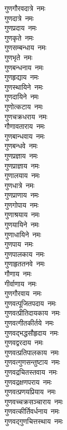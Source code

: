 \begin{multicols}{2}
\begin{flushleft}
गुणगौरवदात्रे~नमः\\
गुणदात्रे~नमः\\
गुणप्रदाय~नमः\\
गुणकृते~नमः\\
गुणसम्बन्धाय~नमः\\
गुणभृते~नमः\\
गुणबन्धनाय~नमः\hfill{}\\
गुणहृद्याय~नमः\\
गुणस्थायिने~नमः\\
गुणदायिने~नमः\\
गुणोत्कटाय~नमः\\
गुणचक्रधराय~नमः\\
गौणावताराय~नमः\\
गुणबान्धवाय~नमः\\
गुणबन्धवे~नमः\\
गुणप्रज्ञाय~नमः\\
गुणप्राज्ञाय~नमः\hfill{}\\
गुणालयाय~नमः\\
गुणधात्रे~नमः\\
गुणप्राणाय~नमः\\
गुणगोपाय~नमः\\
गुणाश्रयाय~नमः\\
गुणयायिने~नमः\\
गुणाधायिने~नमः\\
गुणपाय~नमः\\
गुणपालकाय~नमः\\
गुणाहृततनवे~नमः\hfill{}\\
गौणाय~नमः\\
गीर्वाणाय~नमः\\
गुणगौरवाय~नमः\\
गुणवत्पूजितपदाय~नमः\\
गुणवत्प्रीतिदायकाय~नमः\\
गुणवत्गीतकीर्तये~नमः\\
गुणवद्भद्धसौहृदाय~नमः\\
गुणवद्वरदाय~नमः\\
गुणवत्प्रतिपालकाय~नमः\\
गुणवत्गुणसन्तुष्टाय~नमः\hfill{}\\
गुणवद्रचितस्तवाय~नमः\\
गुणवद्रक्षणपराय~नमः\\
गुणवत्प्रणयप्रियाय~नमः\\
गुणवच्चक्रसञ्चाराय~नमः\\
गुणवत्कीर्तिवर्धनाय~नमः\\
गुणवद्गुणचित्तस्थाय~नमः\\

\end{flushleft}
\end{multicols}
